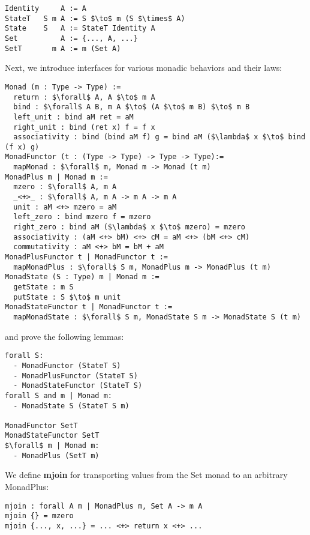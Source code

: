 \documentclass{article}
\begin{document}
\begin{minipage}{\linewidth}
\begin{lstlisting}[mathescape]
Identity     A := A
StateT   S m A := S $\to$ m (S $\times$ A)
State    S   A := StateT Identity A
Set          A := {..., A, ...}
SetT       m A := m (Set A)
\end{lstlisting}
\end{minipage}
Next, we introduce interfaces for various monadic behaviors and their laws:
\begin{minipage}{\linewidth}
\begin{lstlisting}[mathescape]
Monad (m : Type -> Type) :=
  return : $\forall$ A, A $\to$ m A
  bind : $\forall$ A B, m A $\to$ (A $\to$ m B) $\to$ m B
  left_unit : bind aM ret = aM
  right_unit : bind (ret x) f = f x
  associativity : bind (bind aM f) g = bind aM ($\lambda$ x $\to$ bind (f x) g)
MonadFunctor (t : (Type -> Type) -> Type -> Type):= 
  mapMonad : $\forall$ m, Monad m -> Monad (t m)
MonadPlus m | Monad m :=
  mzero : $\forall$ A, m A 
  _<+>_ : $\forall$ A, m A -> m A -> m A
  unit : aM <+> mzero = aM
  left_zero : bind mzero f = mzero
  right_zero : bind aM ($\lambda$ x $\to$ mzero) = mzero
  associativity : (aM <+> bM) <+> cM = aM <+> (bM <+> cM)
  commutativity : aM <+> bM = bM + aM
MonadPlusFunctor t | MonadFunctor t :=
  mapMonadPlus : $\forall$ S m, MonadPlus m -> MonadPlus (t m)
MonadState (S : Type) m | Monad m :=
  getState : m S
  putState : S $\to$ m unit
MonadStateFunctor t | MonadFunctor t := 
  mapMonadState : $\forall$ S m, MonadState S m -> MonadState S (t m)
\end{lstlisting}
and prove the following lemmas:
\begin{lstlisting}[mathescape]
forall S:
  - MonadFunctor (StateT S)
  - MonadPlusFunctor (StateT S)
  - MonadStateFunctor (StateT S)
forall S and m | Monad m:
  - MonadState S (StateT S m)

MonadFunctor SetT
MonadStateFunctor SetT
$\forall$ m | Monad m:
  - MonadPlus (SetT m)
\end{lstlisting}
\end{minipage}

We define \textbf{mjoin} for transporting values from the Set monad to an
arbitrary MonadPlus:
\begin{lstlisting}[mathescape]
mjoin : forall A m | MonadPlus m, Set A -> m A
mjoin {} = mzero
mjoin {..., x, ...} = ... <+> return x <+> ...
\end{lstlisting}
\end{document}

